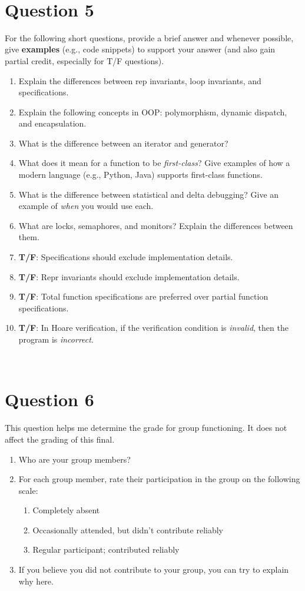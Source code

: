 \documentclass[11pt]{article}
\begin{document}
\newpage
\
\newpage

\section{Question 5}

For the following short questions, provide a brief answer and whenever possible, give \textbf{examples} (e.g., code snippets) to support your answer (and also gain partial credit, especially for T/F questions).
\begin{enumerate} 
\item Explain the differences between rep invariants, loop invariants, and specifications.
\item Explain the following concepts in OOP: polymorphism, dynamic dispatch, and encapsulation.
\item  What is the difference between an iterator and generator?
\item What does it mean for a function to be \emph{first-class}? Give examples of how a modern language (e.g., Python, Java) supports first-class functions.
\item What is the difference between statistical and delta debugging?  Give an example of \emph{when} you would use each.
\item What are locks, semaphores, and monitors?  Explain the differences between them.
\item \textbf{T/F}: Specifications should exclude implementation details.
\item \textbf{T/F}: Repr invariants should exclude implementation details.
\item \textbf{T/F}: Total function specifications are preferred over partial function specifications.
\item \textbf{T/F}: In Hoare verification, if the verification condition is \emph{invalid}, then the program is \emph{incorrect}.
\end{enumerate}


\newpage
\
\newpage 

\section{Question 6}

This question helps me determine the grade for group functioning.  It does not affect the grading of this final.

\begin{enumerate}
\item Who are your group members?
\item For each group member, rate their participation in the group on the following scale:
  \begin{enumerate}
  \item Completely absent
  \item Occasionally attended, but didn't contribute reliably
  \item Regular participant; contributed reliably
  \end{enumerate}
\item If you believe you did not contribute to your group, you can try to explain why here.
\end{enumerate}
\end{document}
